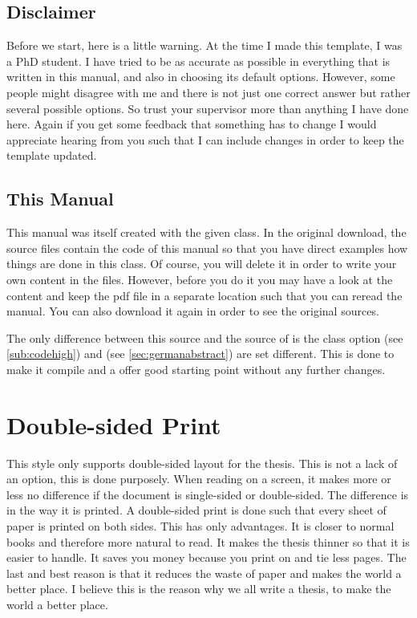 \subsection{Disclaimer}
Before we start, here is a little warning. At the time I made this template, I
was a PhD student.  I have tried to be as accurate as possible in everything
that is written in this manual,  and also in choosing its default options.
However, some people might disagree with me and there is not just one correct
answer but rather several possible options. So trust your supervisor more than
anything I have done here. Again if you get some feedback that something has
to change I would appreciate hearing from you such that I can include changes
in order to keep the template updated.


\subsection{This Manual}
This manual was itself created with the given
 class. In the original download, the source
files contain the code of this manual so that you have direct examples how
things are done in this class. Of course, you will delete it in order to write
your own content in the files. However, before you do it you may have a look
at the content and keep the pdf file in a separate location such that you can
reread the manual. You can also download it again in order to see the original
sources.

The only difference between this source and the source of 
is the class option  (see \autoref{sub:codehigh}) and
 (see \autoref{sec:germanabstract}) are set different.
This is done to make it compile and a offer good starting point without any
further changes.

\section{Double-sided Print}
This style only supports double-sided layout for the thesis. This is not a
lack of an option, this is done purposely.  When reading on a screen, it makes
more or less no difference if the document is single-sided or double-sided.
The difference is in the way it is printed.  A double-sided print is done such
that every sheet of paper is printed on both sides. This has only advantages.
It is closer to normal books and therefore more natural to read. It makes the
thesis thinner so that it is easier to handle. It saves you money because you
print on and tie less pages. The last and best reason is that it reduces the
waste of paper and makes the world a better place. I believe this is the
reason why we all write a thesis, to make the world a better place.


